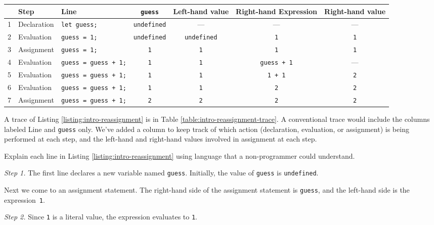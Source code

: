 \begin{table*}
  \small
  \sffamily
  \color{cyan}
  \begin{tabular}{r l | l c|c|c c}
& Step & Line & \texttt{guess} & Left-hand value & Right-hand Expression &
Right-hand value\\
    \hline
1 & Declaration & \texttt{let guess;} & \texttt{undefined} & --- & --- & --- \\2 & Evaluation & \texttt{guess = 1;} & \texttt{undefined} & \texttt{undefined} &
\texttt{1} & \texttt{1}\\
3 & Assignment & \texttt{guess = 1;} & \texttt{1} & \texttt{1} & \texttt{1} &
\texttt{1}\\
4 & Evaluation & \texttt{guess = guess + 1;} & \texttt{1} & \texttt{1} &
\texttt{guess + 1} & --- \\
5 & Evaluation & \texttt{guess = guess + 1;} & \texttt{1} & \texttt{1} &
\texttt{1 + 1} & \texttt{2}\\
6 & Evaluation & \texttt{guess = guess + 1;} & \texttt{1} & \texttt{1} &
\texttt{2} & \texttt{2}\\
7 & Assignment & \texttt{guess = guess + 1;} & \texttt{2} & \texttt{2} &
\texttt{2} & \texttt{2}
  \end{tabular}
\caption{\label{table:intro-reassignment-trace}A trace of the evaluation and
assignment of a variable.}
\end{table*}

A trace of Listing \ref{listing:intro-reassignment} is in Table
\ref{table:intro-reassignment-trace}. A conventional trace would include the
columns labeled Line and \texttt{guess} only. We've added a column to keep track
of which action (declaration, evaluation, or assignment) is being performed at
each step, and the left-hand and right-hand values involved in assignment at
each step.

\begin{question}
Explain each line in Listing \ref{listing:intro-reassignment} using language
that a non-programmer could understand.
\end{question}

\textit{Step 1.} The first line declares a new variable named \texttt{guess}.
Initially, the value of \texttt{guess} is \texttt{undefined}.

Next we come to an assignment statement. The right-hand side of the assignment
statement is \texttt{guess}, and the left-hand side is the
expression~\texttt{1}.

\textit{Step 2.} Since \texttt{1} is a literal value, the expression evaluates
to \texttt{1}.

